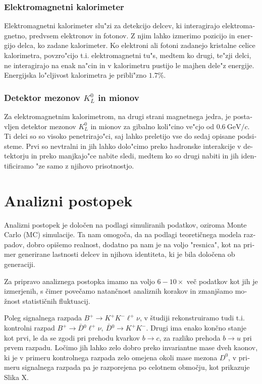 \documentclass[headings=standardclasses,headings=big,oneside,a4paper,openany,12pt]{scrbook}
\newcommand {\e}[1]{\mathrm{~#1}}
\newcommand {\decayb}{$B^+ \to K^+ K^- \ell^+ \nu$}
\begin{document}
\begin{otherlanguage}{slovene}
\subsubsection{Elektromagnetni kalorimeter}
Elektromagnetni kalorimeter slu"zi za detekcijo delcev, ki interagirajo elektromagnetno, predvsem elektronov in fotonov. Z njim lahko izmerimo pozicijo in energijo delca, ko zadane kalorimeter. Ko elektroni ali fotoni zadanejo kristalne celice kalorimetra, povzro"cijo t.i. elektromagnetni tu"s, medtem ko drugi, te"zji delci, ne interagirajo na enak na"cin in v kalorimetru pustijo le majhen dele"z energije. Energijska lo"cljivost kalorimetra je pribli"zno $1.7\%$.

\subsubsection{Detektor mezonov $K_L^0$ in mionov}
Za elektromagnetnim kalorimetrom, na drugi strani magnetnega jedra, je postavljen detektor mezonov $K_L^0$ in mionov za gibalno koli"cino ve"cjo od $0.6\e{GeV}/c$. Ti delci so so visoko penetrirajo"ci, saj lahko preletijo vse do sedaj opisane podsisteme. Prvi so nevtralni in jih lahko dolo"cimo preko hadronske interakcije v detektorju in preko manjkajo"ce nabite sledi, medtem ko so drugi nabiti in jih identificiramo "ze samo z njihovo prisotnostjo.

\section{Analizni postopek}
Analizni postopek je določen na podlagi simuliranih podatkov, oziroma Monte Carlo (MC) simulacije. Ta nam omogoča, da na podlagi teoretičnega modela razpadov, dobro opišemo realnost, dodatno pa nam je na voljo "resnica", kot na primer generirane lastnosti delcev in njihova identiteta, ki je bila določena ob generaciji.

Za pripravo analiznega postopka imamo na voljo $6-10\times$ več podatkov kot jih je izmerjenih, s čimer povečamo natančnost analiznih korakov in zmanjšamo možnost statističnih fluktuacij.

Poleg signalnega razpada \decayb, v študiji rekonstruiramo tudi t.i. kontrolni razpad $B^+ \to \bar D {}^0 \ell^+ \nu,~\bar D{}^0 \to K^+K^-$. Drugi ima enako končno stanje kot prvi, le da se zgodi pri prehodu kvarkov $b \to c$, za razliko prehoda $b \to u$ pri prvem razpadu. Ločimo jih lahko zelo dobro preko invariantne mase dveh kaonov, ki je v primeru kontrolnega razpada zelo omejena okoli mase mezona $D^0$, v primeru signalnega razpada pa je razporejena po celotnem območju, kot prikazuje Slika X.


\end{otherlanguage}
\end{document}

